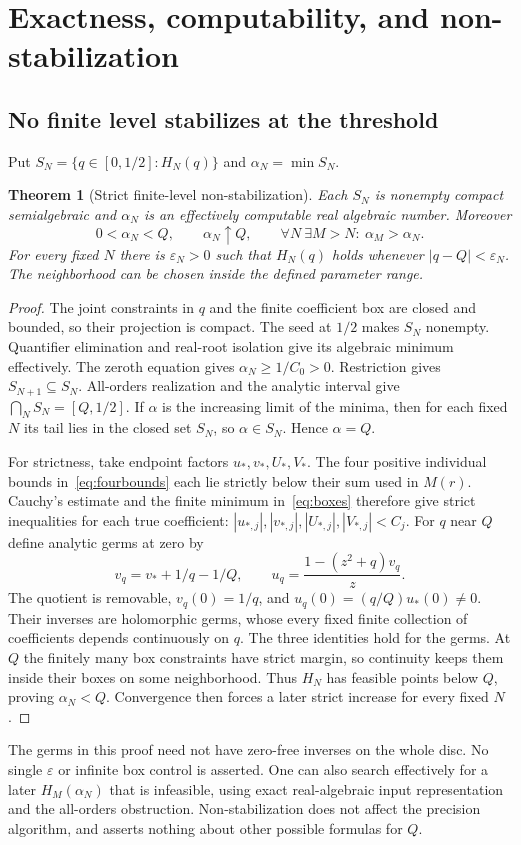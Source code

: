 \documentclass[11pt,a4paper]{article}
\newtheorem{theorem}{Theorem}[section]
\theoremstyle{definition}\newtheorem{definition}[theorem]{Definition}
\theoremstyle{remark}\newtheorem{remark}[theorem]{Remark}
\begin{document}
\section{Exactness, computability, and non-stabilization}\label{sec:discussion}
\subsection{No finite level stabilizes at the threshold}
Put $S_N=\{q\in[0,1/2]:H_N(q)\}$ and $\alpha_N=\min S_N$.
\begin{theorem}[Strict finite-level non-stabilization]\label{thm:nonstable}
Each $S_N$ is nonempty compact semialgebraic and $\alpha_N$ is an
effectively computable real algebraic number. Moreover
\begin{equation}\label{eq:nonstable}
 0<\alpha_N<Q,\qquad \alpha_N\uparrow Q,\qquad
 \forall N\ \exists M>N:\ \alpha_M>\alpha_N.
\end{equation}
For every fixed $N$ there is $\varepsilon_N>0$ such that $H_N(q)$
holds whenever $|q-Q|<\varepsilon_N$. The neighborhood can be chosen
inside the defined parameter range.
\end{theorem}
\begin{proof}
The joint constraints in $q$ and the finite coefficient box are closed
and bounded, so their projection is compact. The seed at $1/2$ makes
$S_N$ nonempty. Quantifier elimination and real-root isolation give its
algebraic minimum effectively. The zeroth equation gives
$\alpha_N\geq1/C_0>0$.
Restriction gives $S_{N+1}\subseteq S_N$. All-orders realization and the
analytic interval give $\bigcap_NS_N=[Q,1/2]$. If $\alpha$ is the
increasing limit of the minima, then for each fixed $N$ its tail lies
in the closed set $S_N$, so $\alpha\in S_N$. Hence $\alpha=Q$.

For strictness, take endpoint factors $u_*,v_*,U_*,V_*$. The four
positive individual bounds in~\eqref{eq:fourbounds} each lie strictly
below their sum used in $M(r)$. Cauchy's estimate and the finite minimum
in~\eqref{eq:boxes} therefore give strict inequalities for each true
coefficient: $|u_{*,j}|,|v_{*,j}|,|U_{*,j}|,|V_{*,j}|<C_j$.
For $q$ near $Q$ define analytic germs at zero by
\[
 v_q=v_*+1/q-1/Q,\qquad u_q=\frac{1-(z^2+q)v_q}{z}.
\]
The quotient is removable, $v_q(0)=1/q$, and
$u_q(0)=(q/Q)u_*(0)\ne0$. Their inverses are holomorphic germs, whose
every fixed finite collection of coefficients depends continuously on
$q$. The three identities hold for the germs. At $Q$ the finitely many
box constraints have strict margin, so continuity keeps them inside
their boxes on some neighborhood. Thus $H_N$ has feasible points below
$Q$, proving $\alpha_N<Q$. Convergence then forces a later strict
increase for every fixed $N$.
\end{proof}
The germs in this proof need not have zero-free inverses on the whole
disc. No single $\varepsilon$ or infinite box control is asserted.
One can also search effectively for a later $H_M(\alpha_N)$ that is
infeasible, using exact real-algebraic input representation and the
all-orders obstruction. Non-stabilization does not affect the precision
algorithm, and asserts nothing about other possible formulas for $Q$.
\end{document}
